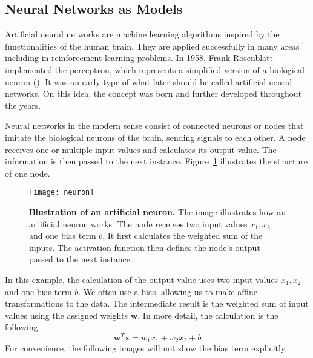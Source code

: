 \subsection{Neural Networks as Models}
\label{subsec:NN}
Artificial neural networks are machine learning algorithms inspired by the functionalities of the human brain. They are applied successfully in many areas including in reinforcement learning problems. In 1958, Frank Rosenblatt implemented the perceptron, which represents a simplified version of a biological neuron (\cite{rosenblatt1958perceptron}). It was an early type of what later should be called artificial neural networks. On this idea, the concept was born and further developed throughout the years.

Neural networks in the modern sense consist of connected neurons or nodes that imitate the biological neurons of the brain, sending signals to each other. A node receives one or multiple input values and calculates its output value. The information is then passed to the next instance. Figure~\ref{fig:neuron} illustrates the structure of one node.
\begin{figure}[ht]
\centering
\texttt{[image: neuron]}
\caption[Illustration of an artificial neuron]{
  \textbf{Illustration of an artificial neuron.}
  The image illustrates how an artificial neuron works. The node receives two input values $x_1, x_2$ and one bias term $b$. It first calculates the weighted sum of the inputs. The activation function then defines the node's output passed to the next instance.
}
\label{fig:neuron}
\end{figure}
In this example, the calculation of the output value uses two input values $x_1, x_2$ and one bias term $b$. We often use a bias, allowing us to make affine transformations to the data. The intermediate result is the weighted sum of input values using the assigned weights $\mathbf{w}$. In  more detail, the calculation is the following:
\[
  \mathbf{w}^T \mathbf{x} = w_1 x_1 + w_2 x_2 + b
\]
For convenience, the following images will not show the bias term explicitly.


